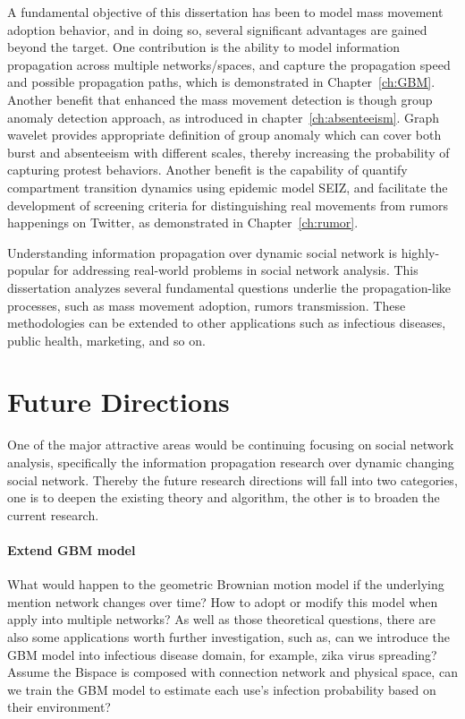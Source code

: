 A fundamental objective of this dissertation has been to model mass movement adoption behavior, and in doing so, several significant advantages are gained beyond the target. One contribution is the ability to model information propagation across multiple networks/spaces, and capture the propagation speed and possible propagation paths, which is demonstrated in Chapter~\ref{ch:GBM}. Another benefit that enhanced the mass movement detection is though group anomaly detection approach, as introduced in chapter~\ref{ch:absenteeism}. Graph wavelet provides appropriate definition of group anomaly which can cover both burst and absenteeism with different scales, thereby increasing the probability of capturing protest behaviors. Another benefit is the capability of quantify compartment transition dynamics using epidemic model SEIZ, and facilitate the development of screening criteria for distinguishing real movements from rumors happenings on Twitter, as demonstrated in Chapter~\ref{ch:rumor}.

Understanding information propagation over dynamic social network is highly-popular for addressing real-world problems in social network analysis. This dissertation analyzes several fundamental questions underlie the propagation-like processes, such as mass movement adoption, rumors transmission. These methodologies can be extended to other applications such as infectious diseases, public health, marketing, and so on.

\section{Future Directions}
One of the major attractive areas would be continuing focusing on social network analysis, specifically the information propagation research over dynamic changing social network. Thereby the future research directions will fall into two categories, one is to deepen the existing theory and algorithm, the other is to broaden the current research.

\paragraph{Extend GBM model}
What would happen to the geometric Brownian motion model if the underlying mention network changes over time? How to adopt or modify this model when apply into multiple networks? As well as those theoretical questions, there are also some applications worth further investigation, such as, can we introduce the GBM model into infectious disease domain, for example, zika virus spreading? Assume the Bispace is composed with connection network and physical space, can we train the GBM model to estimate each use's infection probability based on their environment?


